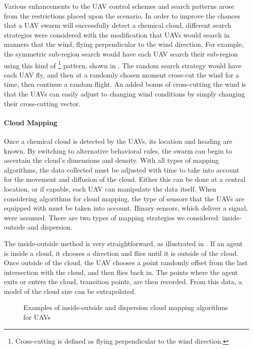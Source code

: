 Various enhancements to the UAV control schemes and search patterns arose from the restrictions placed upon the scenario. In order to improve the chances that a UAV swarm will successfully detect a chemical cloud, different search strategies were considered with the modification that UAVs would search in manners that  the wind, \ie{} flying perpendicular to the wind direction.  For example, the symmetric sub-region search would have each UAV search their sub-region using this kind of \footnote{Cross-cutting is defined as flying perpendicular to the wind direction.} pattern, shown in . The random search strategy would have each UAV fly, and then at a randomly chosen moment cross-cut the wind for a time, then continue a random flight. An added bonus of cross-cutting the wind is that the UAVs can easily adjust to changing wind conditions by simply changing their cross-cutting vector.

\paragraph{Cloud Mapping\\} Once a chemical cloud is detected by the UAVs, its location and heading are known. By switching to alternative behavioral rules, the swarm can begin to ascertain the cloud's dimensions and density. With all types of mapping algorithms, the data collected must be adjusted with time to take into account for the movement and diffusion of the cloud. Either this can be done at a central location, or if capable, each UAV can manipulate the data itself. When considering algorithms for cloud mapping, the type of sensors that the UAVs are equipped with must be taken into account. Binary sensors, which deliver a  signal, were assumed. There are two types of mapping strategies we considered: inside-outside and dispersion.

The inside-outside method is very straightforward, as illustrated in . If an agent is inside a cloud, it chooses a direction and flies until it is outside of the cloud. Once outside of the cloud, the UAV chooses a point randomly offset from the last intersection with the cloud, and then flies back in. The points where the agent exits or enters the cloud, transition points, are then recorded. From this data, a model of the cloud size can be extrapolated.

\begin{figure}[ht]
  \centering
    \qquad
\caption{Examples of inside-outside and dispersion cloud mapping algorithms for UAVs}
\label{fig:MappingAlgorithms}
\end{figure}

